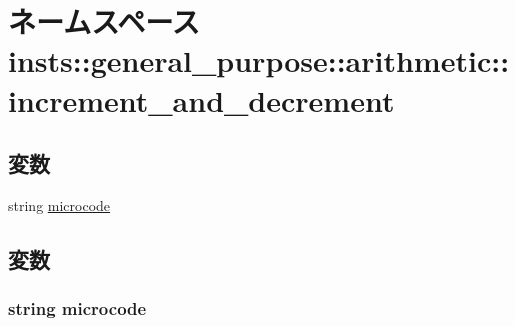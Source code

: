 \hypertarget{namespaceinsts_1_1general__purpose_1_1arithmetic_1_1increment__and__decrement}{
\section{ネームスペース insts::general\_\-purpose::arithmetic::increment\_\-and\_\-decrement}
\label{namespaceinsts_1_1general__purpose_1_1arithmetic_1_1increment__and__decrement}
}
\subsection*{変数}
\begin{DoxyCompactItemize}
\item 
string \hyperlink{namespaceinsts_1_1general__purpose_1_1arithmetic_1_1increment__and__decrement_a770f11a173e99389a8802f0107ed8f52}{microcode}
\end{DoxyCompactItemize}


\subsection{変数}
\hypertarget{namespaceinsts_1_1general__purpose_1_1arithmetic_1_1increment__and__decrement_a770f11a173e99389a8802f0107ed8f52}{
\subsubsection[{microcode}]{\setlength{\rightskip}{0pt plus 5cm}string {\bf microcode}}}
\label{namespaceinsts_1_1general__purpose_1_1arithmetic_1_1increment__and__decrement_a770f11a173e99389a8802f0107ed8f52}
